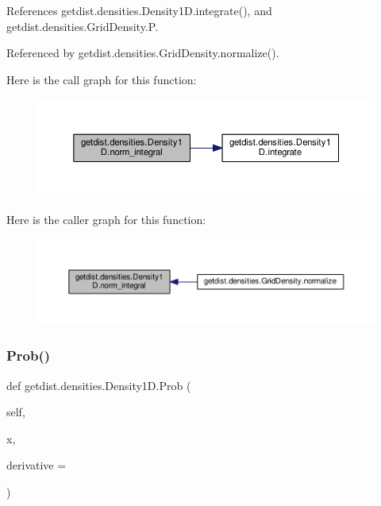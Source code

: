 References getdist.\+densities.\+Density1\+D.\+integrate(), and getdist.\+densities.\+Grid\+Density.\+P.



Referenced by getdist.\+densities.\+Grid\+Density.\+normalize().

Here is the call graph for this function\+:
\nopagebreak
\begin{figure}[H]
\begin{center}
\leavevmode
\includegraphics[width=350pt]{classgetdist_1_1densities_1_1Density1D_a843a026a18dc4edf2ea12ee731e68c79_cgraph}
\end{center}
\end{figure}
Here is the caller graph for this function\+:
\nopagebreak
\begin{figure}[H]
\begin{center}
\leavevmode
\includegraphics[width=350pt]{classgetdist_1_1densities_1_1Density1D_a843a026a18dc4edf2ea12ee731e68c79_icgraph}
\end{center}
\end{figure}
\mbox{\label{classgetdist_1_1densities_1_1Density1D_a4b2fde67983463137942346830c4d00e}} 
\subsubsection{\texorpdfstring{Prob()}{Prob()}}
{\footnotesize\ttfamily def getdist.\+densities.\+Density1\+D.\+Prob (\begin{DoxyParamCaption}\item[{}]{self,  }\item[{}]{x,  }\item[{}]{derivative = {} }\end{DoxyParamCaption})}

